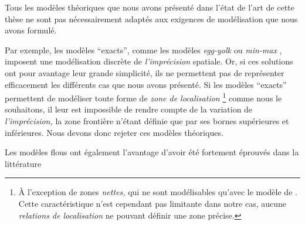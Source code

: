 Tous les modèles théoriques que nous avons présenté dans l'état de
l'art de cette thèse ne sont pas nécessairement adaptés aux exigences
de modélisation que nous avons formulé.


Par exemple, les modèles \enquote{exacts}, comme les modèles
\emph{egg-yolk} \autocite{Cohn1996} ou \emph{min-max}
\autocite{Clementini1996}, imposent une modélisation discrète de
\emph{l'imprécision} spatiale. Or, si ces solutions ont pour avantage
leur grande simplicité, ils ne permettent pas de représenter
efficacement les différents cas que nous avons présenté. Si les
modèles \enquote{exacts} permettent de modéliser toute forme de
\emph{zone de localisation} \footnote{À l'exception de zones
  \emph{nettes,} qui ne sont modélisables qu'avec le modèle de
  \textcite{Bejaoui2009}. Cette caractéristique n'est cependant pas
  limitante dans notre cas, aucune \emph{relations de localisation} ne
  pouvant définir une zone précise.} comme nous le souhaitons, il leur
est impossible de rendre compte de la variation de
\emph{l'imprécision,} la zone frontière n'étant définie que par ses
bornes supérieures et inférieures. Nous devons donc rejeter ces
modèles théoriques.




Les modèles flous ont également l'avantage d'avoir été fortement
éprouvés dans la littérature


